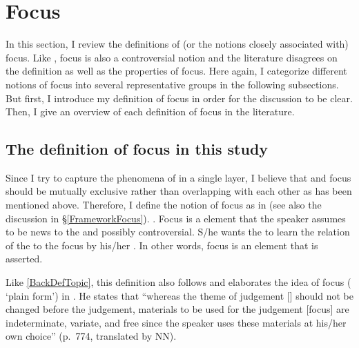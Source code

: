 

\section{Focus}\label{BackSecFocus}

In this section, I review the definitions of (or the notions closely associated with) focus.
Like , focus is also a controversial notion and the literature disagrees on the definition as well as the properties of focus.
Here again, I categorize different notions of focus into several representative groups in the following subsections.
But first, I introduce my definition of focus in order for the discussion to be clear.
Then, I give an overview of each definition of focus in the literature.

\subsection{The definition of focus in this study}\label{BackSubsecDefFocus}

Since I try to capture the phenomena of  in a single layer,
I believe that  and focus should be mutually exclusive rather than overlapping with each other
as has been mentioned above.
Therefore, I define the notion of focus as in \Next
(see also the discussion in \S \ref{FrameworkFocus}).
%
\ex. Focus is a  element that the speaker assumes to be news to the  and possibly controversial.
S/he wants the  to learn the relation of the  to the focus by his/her .
In other words, focus is an element that is asserted.
\label{BackFocDef}

Like \ref{BackDefTopic},
this definition also follows and elaborates the idea of focus ( `plain form') in .
He states that ``whereas the theme of judgement [] should not be changed before the judgement, materials to be used for the judgement [focus] are indeterminate, variate, and free since the speaker uses these materials at his/her own choice'' (p.~774, translated by NN).

